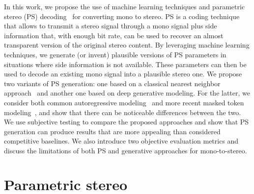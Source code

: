 \documentclass{article}
\begin{document}
In this work, we propose the use of machine learning techniques and parametric stereo (PS) decoding~\cite{Purnhagen_2004,Breebaart2005} for converting mono to stereo. PS is a coding technique that allows to transmit a stereo signal through a mono signal plus side information that, with enough bit rate, can be used to recover an almost transparent version of the original stereo content. 
By leveraging machine learning techniques, we generate (or invent) plausible versions of PS parameters in situations where side information is not available. These parameters can then be used to decode an existing mono signal into a plausible stereo one. 
We propose two variants of PS generation: one based on a classical nearest neighbor approach~\cite{Hastie_2009} and another one based on deep generative modeling. For the latter, we consider both common autoregressive modeling~\cite{Radford_2018} and more recent masked token modeling~\cite{Chang_2022}, and show that there can be noticeable differences between the two. We use subjective testing to compare the proposed approaches and show that PS generation can produce results that are more appealing than considered competitive baselines. We also introduce two objective evaluation metrics and discuss the limitations of both PS and generative approaches for mono-to-stereo.

\section{Parametric stereo}
\label{sec:ps}
\end{document}
